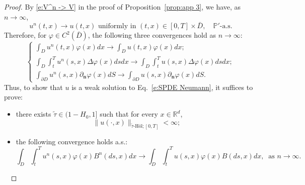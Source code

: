 \documentclass[11pt,reqno]{amsart}
\def\R{\mathbb R}
\numberwithin{equation}{section}
\begin{document}
\begin{proof}
By \eqref{e:V^n -> V} in the proof of Proposition~\ref{prop:app 3}, we have, as $n\to \infty$, 
\begin{equation}\label{e:u^n -> u}
u^{n}(t,x) \rightarrow u(t,x)\text{ uniformly in }(t,x)\in[0,T]\times \bar{D}, \quad \mathbb{P}'\text{-a.s.}
\end{equation}
Therefore, for $\varphi\in C^{2}(\bar{D})$, the following three convergences hold  as $n\rightarrow\infty$: 
\begin{equation*}
    \begin{cases}
\displaystyle\int_{D}u^{n}(t,x)\varphi(x)dx\rightarrow \int_{D}u(t,x)\varphi(x)dx;\\[6pt]
\displaystyle \int_{D}\int_{t}^{T} u^{n}(s,x)\Delta \varphi(x) ds dx \rightarrow \int_{D}\int_{t}^{T} u(s,x)\Delta \varphi(x) ds dx;\\[6pt]
\displaystyle \int_{\partial D} u^{n}(s,x) \partial_{\mathbf{n}}\varphi(x) dS\rightarrow \int_{\partial D} u(s,x) \partial_{\mathbf{n}}\varphi(x) dS.
    \end{cases}
\end{equation*}
Thus, to show that $u$ is a weak solution to Eq.~\eqref{e:SPDE Neumann}, it suffices to prove:
\begin{itemize}
\item[(a)] there exists $\tilde{\tau}\in (1 - H_0, 1]$ such that for every $x\in\R^d$,
\begin{equation}\label{e:weak sol condi 1}
\|u(\cdot,x)\|_{\tilde{\tau}\text{-H\"ol};[0,T]}<\infty;
\end{equation}

\item[(b)] the following convergence holds a.s.:
\begin{equation}\label{e:weak sol condi 2}
\int_{D}\int_{t}^{T}u^{n}(s,x)\varphi(x)B^{n}(ds,x)dx\to \int_{D}\int_{t}^{T}u(s,x)\varphi(x)B(ds,x)dx, ~\text{ as } n\to\infty. 
\end{equation}
\end{itemize}


\



\end{proof}
\end{document}
